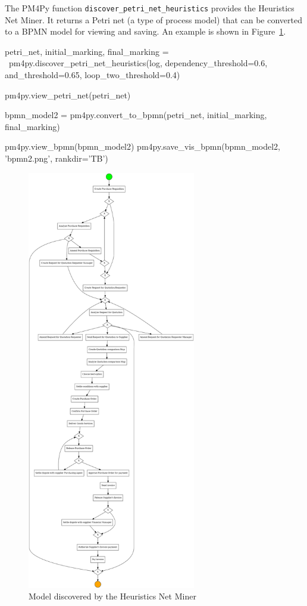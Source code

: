 The PM4Py function \texttt{discover\_petri\_net\_heuristics} provides the Heuristics Net Miner. It returns a Petri net (a type of process model) that can be converted to a BPMN model for viewing and saving. An example is shown in Figure~\ref{fig:heuristics_example}.

\begin{samepage}
\begin{pythoncode}
petri_net, initial_marking, final_marking = \
    pm4py.discover_petri_net_heuristics(log, 
        dependency_threshold=0.6,
        and_threshold=0.65,
        loop_two_threshold=0.4)
        
pm4py.view_petri_net(petri_net)
        
bpmn_model2 = pm4py.convert_to_bpmn(petri_net, 
    initial_marking, final_marking)
    
pm4py.view_bpmn(bpmn_model2)
pm4py.save_vis_bpmn(bpmn_model2, 'bpmn2.png', rankdir='TB')
\end{pythoncode}
\end{samepage}

\begin{figure}
\centering
\includegraphics[height=7.25in]{bpmn2.png}
\caption{Model discovered by the Heuristics Net Miner}
\label{fig:heuristics_example}
\end{figure}

